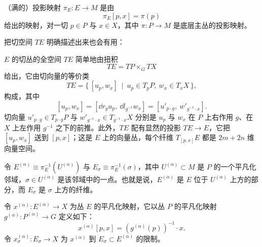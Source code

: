 \begin{definition}
（满的）投影映射 $\pi_E: E\to M$ 是由
\[ \pi_E[p,x] = \pi(p) \]
给出的映射，对一切 $p\in P$ 与 $x\in X$，其中 $\pi: P\to M$ 是底层主丛的投影映射。
\end{definition}


把切空间 $TE$ 明确描述出来也会有用：

\begin{theorem}
$E$ 的切丛的全空间 $TE$ 简单地由扭积
\[ TE = TP\times_G TX \]
给出，它由切向量的等价类
\[ TE = \{\,[u_p,w_x]\ \mid\ u_p\in T_pP,\ w_x\in T_xX\,\}, \]
构成，其中
\[
    [u_p,w_x] = [\dd r_g u_p,\ \dd l_{g^{-1}}w_x] = [u'_{p\cdot g},\ w'_{g^{-1}\cdot x}].
\]
切向量 $u'_{p\cdot g}\in T_{p\cdot g}P$ 与 $w'_{g^{-1}\cdot x}\in T_{g^{-1}\cdot x}X$ 分别是 $u_p$ 与 $w_x$ 在 $P$ 上右作用 $g$、在 $X$ 上左作用 $g^{-1}$ 之下的前推。此外，$TE$ 配有显然的投影 $TE\to E$，它把 $[u_p,w_x]$ 送到 $[p,x]$；这是 $E$ 上的向量丛，每个纤维 $T_{[p,x]}E$ 都是 $2m+2n$ 维向量空间。
\end{theorem}


\begin{definition}
令 $E^{(\alpha)}\equiv\pi_E^{-1}(U^{(\alpha)})$ 与 $E_\sigma\equiv\pi_E^{-1}(\sigma)$，其中 $U^{(\alpha)}\subset M$ 是 $P$ 的一个平凡化邻域，$\sigma\in U^{(\alpha)}$ 是该邻域中的一点。也就是说，$E^{(\alpha)}$ 是 $E$ 位于 $U^{(\alpha)}$ 上方的部分，而 $E_\sigma$ 是 $\sigma$ 上方的纤维。
\end{definition}

\begin{definition}
令 $x^{(\alpha)}: E^{(\alpha)}\to X$ 为丛 $E$ 的平凡化映射，它以丛 $P$ 的平凡化映射 $g^{(\alpha)}: P^{(\alpha)}\to G$ 定义如下：
\[ x^{(\alpha)}[p,x] = (g^{(\alpha)}(p))^{-1}\cdot x . \]
令 $x^{(\alpha)}_\sigma: E_\sigma\to X$ 为 $x^{(\alpha)}$ 到 $E_\sigma\subset E^{(\alpha)}$ 的限制。
\end{definition}


